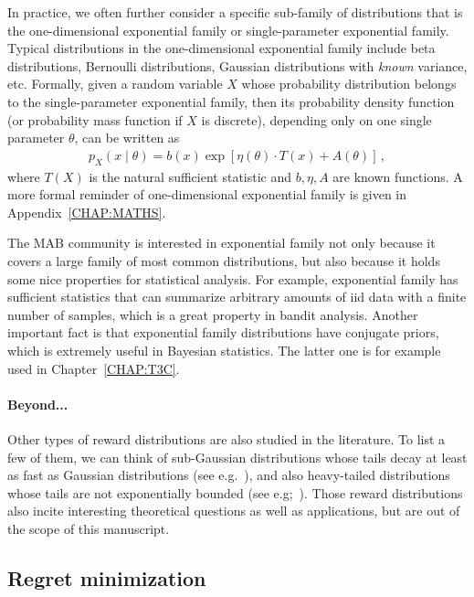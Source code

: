 In practice, we often further consider a specific sub-family of distributions that is the \gls{one-dimensional exponential family} or \gls{single-parameter exponential family}. Typical distributions in the one-dimensional exponential family include beta distributions, Bernoulli distributions, Gaussian distributions with \emph{known} variance, etc. Formally, given a random variable $X$ whose probability distribution belongs to the single-parameter exponential family, then its \gls{probability density function} (or \gls{probability mass function} if $X$ is discrete), depending only on one single parameter $\theta$, can be written as
\begin{align}\label{eq:mab.exponential}
    p_{X}(x \mid \theta ) = b(x) \exp \left[\eta (\theta ) \cdot T(x) + A(\theta )\right]\,,
\end{align}
where $T(X)$ is the \gls{natural sufficient statistic} and $b,\eta,A$ are known functions. A more formal reminder of one-dimensional exponential family is given in Appendix~\ref{CHAP:MATHS}.

The MAB community is interested in exponential family not only because it covers a large family of most common distributions, but also because it holds some nice properties for statistical analysis. For example, exponential family has sufficient statistics that can summarize arbitrary amounts of \gls{iid} data with a finite number of samples, which is a great property in bandit analysis. Another important fact is that exponential family distributions have conjugate priors, which is extremely useful in Bayesian statistics. The latter one is for example used in Chapter~\ref{CHAP:T3C}.

\paragraph{Beyond...}

Other types of reward distributions are also studied in the literature. To list a few of them, we can think of sub-Gaussian distributions whose tails decay at least as fast as Gaussian distributions (see e.g.~\citealt{}), and also heavy-tailed distributions whose tails are not exponentially bounded (see e.g;~\citealt{yu2018heavy}). Those reward distributions also incite interesting theoretical questions as well as applications, but are out of the scope of this manuscript.

\subsection{Regret minimization}\label{sec:mab.model.regret}

